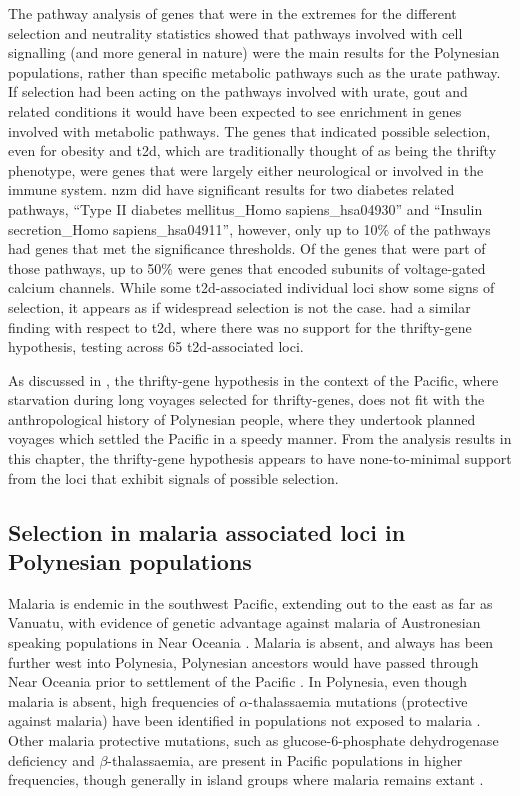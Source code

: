 \documentclass[twoside,openright]{report}
\begin{document}
The pathway analysis of genes that were in the extremes for the
different selection and neutrality statistics showed that pathways
involved with cell signalling (and more general in nature) were the main
results for the Polynesian populations, rather than specific metabolic
pathways such as the urate pathway. If selection had been acting on the
pathways involved with urate, gout and related conditions it would have
been expected to see enrichment in genes involved with metabolic
pathways. The genes that indicated possible selection, even for obesity
and \gls{t2d}, which are traditionally thought of as being the thrifty
phenotype, were genes that were largely either neurological or involved
in the immune system. \gls{nzm} did have significant results for two
diabetes related pathways, ``Type II diabetes mellitus\_Homo
sapiens\_hsa04930'' and ``Insulin secretion\_Homo sapiens\_hsa04911'',
however, only up to 10\% of the pathways had genes that met the
significance thresholds. Of the genes that were part of those pathways,
up to 50\% were genes that encoded subunits of voltage-gated calcium
channels. While some \gls{t2d}-associated individual loci show some
signs of selection, it appears as if widespread selection is not the
case. \citet{Ayub2014c} had a similar finding with respect to \gls{t2d},
where there was no support for the thrifty-gene hypothesis, testing
across 65 \gls{t2d}-associated loci.

As discussed in \citet{Gosling2014}, the thrifty-gene hypothesis in the
context of the Pacific, where starvation during long voyages selected
for thrifty-genes, does not fit with the anthropological history of
Polynesian people, where they undertook planned voyages which settled
the Pacific in a speedy manner. From the analysis results in this
chapter, the thrifty-gene hypothesis appears to have none-to-minimal
support from the loci that exhibit signals of possible selection.

\subsection{Selection in malaria associated loci in Polynesian
populations}\label{selection-in-malaria-associated-loci-in-polynesian-populations}

Malaria is endemic in the southwest Pacific, extending out to the east
as far as Vanuatu, with evidence of genetic advantage against malaria of
Austronesian speaking populations in Near Oceania \citep{Clark1993}.
Malaria is absent, and always has been further west into Polynesia,
Polynesian ancestors would have passed through Near Oceania prior to
settlement of the Pacific \citep{Clark1993}. In Polynesia, even though
malaria is absent, high frequencies of \(\alpha\)-thalassaemia mutations
(protective against malaria) have been identified in populations not
exposed to malaria \citep{Hill1985}. Other malaria protective mutations,
such as glucose-6-phosphate dehydrogenase deficiency and
\(\beta\)-thalassaemia, are present in Pacific populations in higher
frequencies, though generally in island groups where malaria remains
extant \citep{Flint1986, Cappellini2008}.
\end{document}
